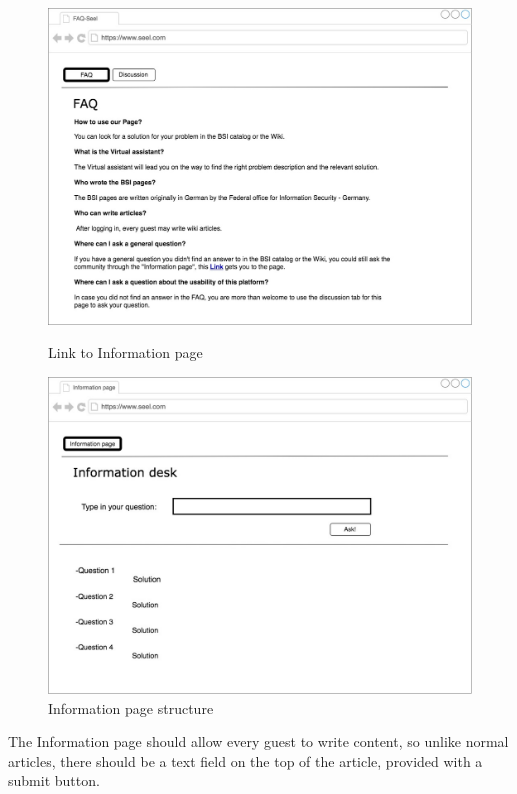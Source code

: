\begin{figure}[h]
  \centering
\begin{minipage}[b]{0.48\textwidth}
    \includegraphics[width=\textwidth]{Pictures/information1.jpg}
    \caption{Link to Information page}
  \end{minipage}
  \hfill
  \begin{minipage}[b]{0.48\textwidth}
    \includegraphics[width=\textwidth]{Pictures/information2.jpg}
    \caption{Information page structure}
  \end{minipage}
\end{figure} 
 

The Information page should allow every guest to write content, so unlike normal articles, there should be a text field on the top of the article, provided with a submit button.


